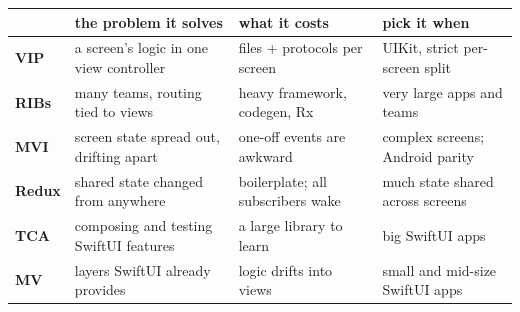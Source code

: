 \documentclass[8pt]{extarticle}
\begin{document}



\vspace{2pt}
{\small\setlength{\tabcolsep}{3pt}\renewcommand{\arraystretch}{1.08}
\noindent\begin{tabular}{@{}>{\raggedright\arraybackslash}p{12mm}>{\raggedright\arraybackslash}p{52mm}>{\raggedright\arraybackslash}p{46mm}>{\raggedright\arraybackslash}p{46mm}@{}}
\toprule
 & \textbf{the problem it solves} & \textbf{what it costs} & \textbf{pick it when} \\
\midrule
\textbf{VIP} & a screen's logic in one view controller & 6 files + protocols per screen & UIKit, strict per-screen split \\
\textbf{RIBs} & many teams, routing tied to views & heavy framework, codegen, Rx & very large apps and teams \\
\textbf{MVI} & screen state spread out, drifting apart & one-off events are awkward & complex screens; Android parity \\
\textbf{Redux} & shared state changed from anywhere & boilerplate; all subscribers wake & much state shared across screens \\
\textbf{TCA} & composing and testing SwiftUI features & a large library to learn & big SwiftUI apps \\
\textbf{MV} & layers SwiftUI already provides & logic drifts into views & small and mid-size SwiftUI apps \\
\bottomrule
\end{tabular}}
\end{document}
